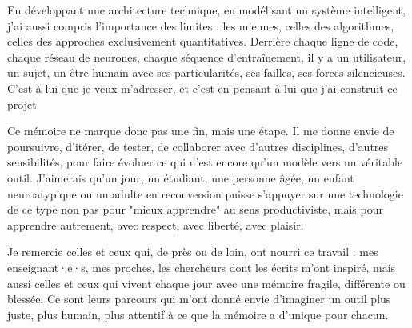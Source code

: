 \documentclass[11pt,a4paper]{report}
\begin{document}
En développant une architecture technique, en modélisant un système intelligent, j’ai aussi compris l’importance des limites : les miennes, celles des algorithmes, celles des approches exclusivement quantitatives. Derrière chaque ligne de code, chaque réseau de neurones, chaque séquence d’entraînement, il y a un utilisateur, un sujet, un être humain avec ses particularités, ses failles, ses forces silencieuses. C’est à lui que je veux m’adresser, et c’est en pensant à lui que j’ai construit ce projet.

Ce mémoire ne marque donc pas une fin, mais une étape. Il me donne envie de poursuivre, d’itérer, de tester, de collaborer avec d’autres disciplines, d’autres sensibilités, pour faire évoluer ce qui n’est encore qu’un modèle vers un véritable outil. J’aimerais qu’un jour, un étudiant, une personne âgée, un enfant neuroatypique ou un adulte en reconversion puisse s’appuyer sur une technologie de ce type non pas pour "mieux apprendre" au sens productiviste, mais pour apprendre autrement, avec respect, avec liberté, avec plaisir.

Je remercie celles et ceux qui, de près ou de loin, ont nourri ce travail : mes enseignant·e·s, mes proches, les chercheurs dont les écrits m’ont inspiré, mais aussi celles et ceux qui vivent chaque jour avec une mémoire fragile, différente ou blessée. Ce sont leurs parcours qui m’ont donné envie d’imaginer un outil plus juste, plus humain, plus attentif à ce que la mémoire a d’unique pour chacun.
\end{document}
